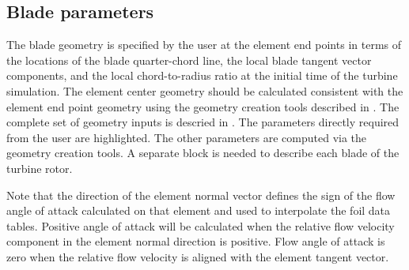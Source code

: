 \subsection{Blade parameters}
The blade geometry is specified by the user at the element end points in terms of the locations of the blade quarter-chord line, the local blade tangent vector components, and the local chord-to-radius ratio at the initial time of the turbine simulation. The element center geometry should be calculated consistent with the element end point geometry using the geometry creation tools described in . The complete set of geometry inputs is descried in . The parameters directly required from the user are highlighted. The other parameters are computed via the geometry creation tools. A separate block is needed to describe each blade of the turbine rotor.

Note that the direction of the element normal vector defines the sign of the flow angle of attack calculated on that element and used to interpolate the foil data tables. Positive angle of attack will be calculated when the relative flow velocity component in the element normal direction is positive. Flow angle of attack is zero when the relative flow velocity is aligned with the element tangent vector.

